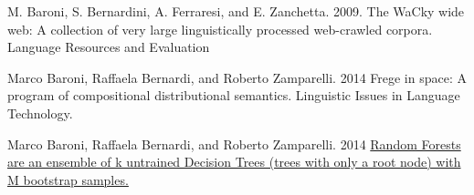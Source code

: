 \documentclass[a4paper]{article}
\begin{document}
\begin{thebibliography}{99}
M. Baroni, S. Bernardini, A. Ferraresi, and E. Zanchetta. 2009.
\textrm{The WaCky wide web: A collection of very large linguistically processed web-crawled corpora. Language Resources and Evaluation}

Marco Baroni, Raffaela Bernardi, and Roberto Zamparelli. 2014
\textrm{Frege in space: A program of compositional
distributional semantics. Linguistic Issues
in Language Technology.}

Marco Baroni, Raffaela Bernardi, and Roberto Zamparelli. 2014
\href{https://towardsdatascience.com/decision-trees-and-random-forests-for-classification-and-regression-pt-2-2b1fcd03e342}
\textrm{Random Forests are an ensemble of k untrained Decision Trees (trees with only a root node) with M bootstrap samples.}

\end{thebibliography}
\end{document}
